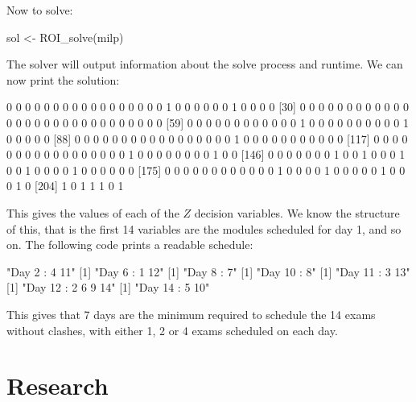 Now to solve:

\begin{Rin-no-test}
sol <- ROI_solve(milp)
\end{Rin-no-test}

The solver will output information about the solve process and runtime.
We can now print the solution:


\begin{Rout-no-test}
  [1] 0 0 0 0 0 0 0 0 0 0 0 0 0 0 0 0 0 1 0 0 0 0 0 0 1 0 0 0 0
 [30] 0 0 0 0 0 0 0 0 0 0 0 0 0 0 0 0 0 0 0 0 0 0 0 0 0 0 0 0 0
 [59] 0 0 0 0 0 0 0 0 0 0 0 0 1 0 0 0 0 0 0 0 0 0 0 1 0 0 0 0 0
 [88] 0 0 0 0 0 0 0 0 0 0 0 0 0 0 0 0 0 1 0 0 0 0 0 0 0 0 0 0 0
[117] 0 0 0 0 0 0 0 0 0 0 0 0 0 0 0 0 0 1 0 0 0 0 0 0 0 0 1 0 0
[146] 0 0 0 0 0 0 0 1 0 0 1 0 0 0 1 0 0 1 0 0 0 0 1 0 0 0 0 0 0
[175] 0 0 0 0 0 0 0 0 0 0 0 0 1 0 0 0 0 1 0 0 0 0 0 1 0 0 0 1 0
[204] 1 0 1 1 1 0 1
\end{Rout-no-test}

This gives the values of each of the $Z$ decision variables.
We know the structure of this, that is the first 14 variables are the modules
scheduled for day 1, and so on.
The following code prints a readable schedule:


\begin{Rout-no-test}
[1] "Day 2 : 4 11"
[1] "Day 6 : 1 12"
[1] "Day 8 : 7"
[1] "Day 10 : 8"
[1] "Day 11 : 3 13"
[1] "Day 12 : 2 6 9 14"
[1] "Day 14 : 5 10"
\end{Rout-no-test}

This gives that 7 days are the minimum required to schedule the 14 exams without
clashes, with either 1, 2 or 4 exams scheduled on each day.

\section{Research}\label{sec:research}
